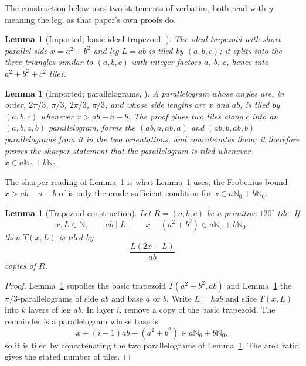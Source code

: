 \documentclass[11pt]{amsart}
\newtheorem{lemma}[theorem]{Lemma}
\theoremstyle{definition}
\theoremstyle{remark}
\newcommand{\N}{\mathbb N}
\newcommand{\Nzero}{\mathbb N_0}
\begin{document}
The construction below uses two statements of \cite{Zhang25} verbatim, both
read with $y$ meaning the leg, as that paper's own proofs do.

\begin{lemma}[Imported; basic ideal trapezoid, {\cite[Lemma~1]{Zhang25}}]
\label{lem:imp-zhang1}
The ideal trapezoid with short parallel side $x=a^2+b^2$ and leg $L=ab$ is
tiled by $(a,b,c)$; it splits into the three triangles similar to $(a,b,c)$
with integer factors $a$, $b$, $c$, hence into $a^2+b^2+c^2$ tiles.
\end{lemma}

\begin{lemma}[Imported; parallelograms, {\cite[Lemma~2]{Zhang25}}]
\label{lem:imp-zhang2}
A parallelogram whose angles are, in order, $2\pi/3$, $\pi/3$, $2\pi/3$,
$\pi/3$, and whose side lengths are $x$ and $ab$, is tiled by $(a,b,c)$
whenever $x>ab-a-b$.  The proof glues two
tiles along $c$ into an $(a,b,a,b)$ parallelogram, forms the
$(ab,a,ab,a)$ and $(ab,b,ab,b)$ parallelograms from it in the two
orientations, and concatenates them; it therefore proves the sharper
statement that the parallelogram is tiled whenever
$x\in a\Nzero+b\Nzero$.
\end{lemma}

\noindent The sharper reading of Lemma~\ref{lem:imp-zhang2} is what
Lemma~\ref{lem:trapezoid} uses; the Frobenius bound $x>ab-a-b$ of
\cite[Prop.~2]{Zhang25} is only the crude sufficient condition for
$x\in a\Nzero+b\Nzero$.

\begin{lemma}[Trapezoid construction]\label{lem:trapezoid}
Let $R=(a,b,c)$ be a primitive $120^\circ$ tile.  If
\[
       x,L\in\N,\qquad
       ab\mid L,\qquad x-(a^2+b^2)\in a\Nzero+b\Nzero,
\]
then $T(x,L)$ is tiled by
\[
                    \frac{L(2x+L)}{ab}
\]
copies of $R$.
\end{lemma}

\begin{proof}
Lemma~\ref{lem:imp-zhang1} supplies the basic trapezoid $T(a^2+b^2,ab)$ and
Lemma~\ref{lem:imp-zhang2} the
$\pi/3$-parallelograms of side $ab$ and base $a$ or $b$.
Write $L=kab$ and slice $T(x,L)$ into $k$
layers of leg $ab$.  In layer $i$, remove a copy of the basic trapezoid.
The remainder is a parallelogram whose base is
\[
       x+(i-1)ab-(a^2+b^2)\in a\Nzero+b\Nzero,
\]
so it is tiled by concatenating the two parallelograms of
Lemma~\ref{lem:imp-zhang2}.  The area ratio
gives the stated number of tiles.
\end{proof}
\end{document}
